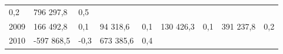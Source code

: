 \begin{longtable}[]{@{}lllllllll@{}}
\begin{minipage}[t]{0.06\columnwidth}
0,2\strut
\end{minipage} & \begin{minipage}[t]{0.10\columnwidth}\raggedright
796 297,8\strut
\end{minipage} & \begin{minipage}[t]{0.06\columnwidth}\raggedright
0,5\strut
\end{minipage}\tabularnewline
\begin{minipage}[t]{0.05\columnwidth}\raggedright
2009\strut
\end{minipage} & \begin{minipage}[t]{0.10\columnwidth}\raggedright
166 492,8\strut
\end{minipage} & \begin{minipage}[t]{0.06\columnwidth}\raggedright
0,1\strut
\end{minipage} & \begin{minipage}[t]{0.16\columnwidth}\raggedright
94 318,6\strut
\end{minipage} & \begin{minipage}[t]{0.06\columnwidth}\raggedright
0,1\strut
\end{minipage} & \begin{minipage}[t]{0.12\columnwidth}\raggedright
130 426,3\strut
\end{minipage} & \begin{minipage}[t]{0.06\columnwidth}\raggedright
0,1\strut
\end{minipage} & \begin{minipage}[t]{0.10\columnwidth}\raggedright
391 237,8\strut
\end{minipage} & \begin{minipage}[t]{0.06\columnwidth}\raggedright
0,2\strut
\end{minipage}\tabularnewline
\begin{minipage}[t]{0.05\columnwidth}\raggedright
2010\strut
\end{minipage} & \begin{minipage}[t]{0.10\columnwidth}\raggedright
-597 868,5\strut
\end{minipage} & \begin{minipage}[t]{0.06\columnwidth}\raggedright
-0,3\strut
\end{minipage} & \begin{minipage}[t]{0.16\columnwidth}\raggedright
673 385,6\strut
\end{minipage} & \begin{minipage}[t]{0.06\columnwidth}\raggedright
0,4\strut
\end{minipage} & \begin{minipage}[t]{0.12\columnwidth}\raggedright

\end{minipage}
\end{longtable}
